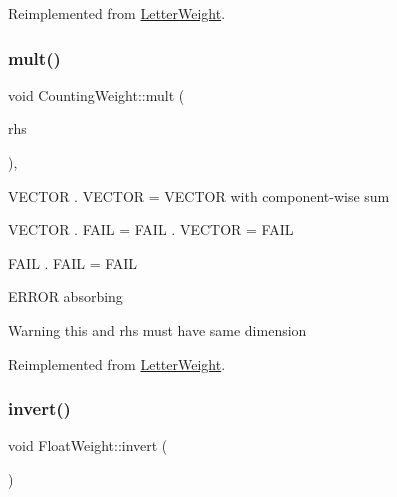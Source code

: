 Reimplemented from \mbox{\hyperlink{group__weight_ga49b09c8f364a2ebf1d154f606d9aaea8}{Letter\+Weight}}.

\mbox{\label{group__weight_ga102af16b814daad826afb91d6f6c75b3}} 
\subsubsection{\texorpdfstring{mult()}{mult()}\hspace{0.1cm}{\footnotesize\ttfamily [1/5]}}
{\footnotesize\ttfamily void Counting\+Weight\+::mult (\begin{DoxyParamCaption}\item[{const \mbox{\hyperlink{classLetterWeight}{Letter\+Weight}} $\ast$}]{rhs }\end{DoxyParamCaption})\hspace{0.3cm}{\ttfamily [protected]}, {\ttfamily [virtual]}}


\begin{DoxyItemize}
\item V\+E\+C\+T\+OR . V\+E\+C\+T\+OR = V\+E\+C\+T\+OR with component-\/wise sum
\item V\+E\+C\+T\+OR . F\+A\+IL = F\+A\+IL . V\+E\+C\+T\+OR = F\+A\+IL
\item F\+A\+IL . F\+A\+IL = F\+A\+IL
\item E\+R\+R\+OR absorbing \begin{DoxyWarning}{Warning}
this and rhs must have same dimension 
\end{DoxyWarning}

\end{DoxyItemize}

Reimplemented from \mbox{\hyperlink{group__weight_gad1208e74e54ca8fc2f361e6fc106df01}{Letter\+Weight}}.

\mbox{\label{group__weight_ga45533bb9d354577728ddb1e0a42c4bab}} 
\subsubsection{\texorpdfstring{invert()}{invert()}\hspace{0.1cm}{\footnotesize\ttfamily [1/4]}}
{\footnotesize\ttfamily void Float\+Weight\+::invert (\begin{DoxyParamCaption}{ }\end{DoxyParamCaption})\hspace{0.3cm}{\ttfamily [virtual]}}



